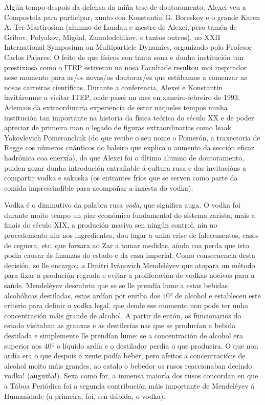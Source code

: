\begin{refsection}
\begin{multicols}{2}
Algún tempo despois da defensa da miña tese de doutoramento, Alexei veu a Compostela para participar, xunto con Konstantin G. Boreskov e o grande Karen A. Ter-Martirosian (alumno de Landau e mestre de Alexei, pero tamén de Gribov, Polyakov, Migdal, Zamolodchikov, e tantos outros), no XXII International Symposium on Multiparticle Dynamics, organizado polo Profesor Carlos Pajares. O feito de que físicos con tanta sona e dunha institución tan prestixiosa como o ITEP estiveran na nosa Facultade resultou moi inspirador nese momento para as/os novas/os doutoras/es que estábamos a comenzar as nosas carreiras científicas. Durante a conferencia, Alexei e Konstantin invitáronme a visitar ITEP, onde pasei un mes en xaneiro-febreiro de 1993. Ademais da extraordinaria experiencia de estar naqueles tempos nunha institución tan importante na historia da física teórica do século XX e de poder apreciar de primeira man o legado de figuras extraordinarias como Isaak Yakovlevich Pomeranchuk (do que recibe o seu nome o Pomerón, a traxectoria de Regge cos números cuánticos do baleiro que explica o aumento da sección eficaz hadrónica coa enerxía), do que Alexei foi o último alumno de doutoramento, puiden gozar dunha introdución entrañable á cultura rusa e das invitacións a compartir vodka e sakuska (os entrantes fríos que se serven como parte da comida imprescindible para acompañar a inxesta do vodka).

Vodka é o diminutivo da palabra rusa \textit{voda}, que significa auga. O vodka foi durante moito tempo un piar económico fundamental do sistema zarista, mais a finais do século XIX, a produción masiva sen ningún control, nin no procedemento nin nos ingredientes, dou lugar a unha crise de falecementos, casos de ceguera, etc. que forzara ao Zar a tomar medidas, aínda coa perda que isto podía causar ás finanzas do estado e da casa imperial. Como consecuencia desta decisión, se lle encargou a Dmitri Ivánovich Mendeléyev que atopara un método para fixar a produción regrada e evitar a proliferación de vodkas nocivos para a saúde. Mendeléyev descubriu que se se lle prendía lume a estas bebidas alcohólicas destiladas, estas ardían por enriba dos 40º de alcohol e estableceu este criterio para definir o vodka legal, que dende ese momento non pode ter unha concentración máis grande de alcohol. A partir de entón, os funcionarios do estado visitaban as granxas e as destilerías nas que se producían a bebida destilada e simplemente lle prendían lume: se a concentración de alcohol era superior aos 40º o líquido ardía e o destilador perdía o que producira. O que non ardía era o que despois a xente podía beber, pero afeitos a concentracións de alcohol moito máis grandes, ao catalo o bebedor os rusos reaccionaban decindo vodka! (auguiña!). Sexa como for, a inmensa maioría dos rusos concordan en que a Táboa Periódica foi a segunda contribución máis importante de Mendeléyev á Humanidade (a primeira, foi, sen dúbida, o vodka).


\end{multicols}
\end{refsection}
